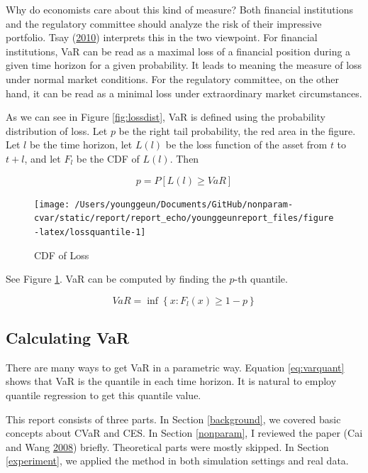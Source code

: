 \documentclass[
]{article}
\theoremstyle{definition}
\theoremstyle{definition}
\theoremstyle{definition}
\theoremstyle{remark}
\begin{document}
Why do economists care about this kind of measure? Both financial institutions and the regulatory committee should analyze the risk of their impressive portfolio. Tsay (\protect\hyperlink{ref-Tsay:2010aa}{2010}) interprets this in the two viewpoint. For financial institutions, VaR can be read as a maximal loss of a financial position during a given time horizon for a given probability. It leads to meaning the measure of loss under normal market conditions. For the regulatory committee, on the other hand, it can be read as a minimal loss under extraordinary market circumstances.

As we can see in Figure \ref{fig:lossdist}, VaR is defined using the probability distribution of loss. Let \(p\) be the right tail probability, the red area in the figure. Let \(l\) be the time horizon, let \(L(l)\) be the loss function of the asset from \(t\) to \(t + l\), and let \(F_l\) be the CDF of \(L(l)\). Then

\begin{equation}
  p = P \left[ L(l) \ge VaR \right]
  \label{eq:vardef}
\end{equation}

\begin{figure}[H]

{\centering \texttt{[image: /Users/younggeun/Documents/GitHub/nonparam-cvar/static/report/report\_echo/younggeunreport\_files/figure-latex/lossquantile-1]} 

}

\caption{CDF of Loss}\label{fig:lossquantile}
\end{figure}

See Figure \ref{fig:lossquantile}. VaR can be computed by finding the \(p\)-th quantile.

\begin{equation}
  VaR = \inf \left\{ x \mathpunct{:} F_l(x) \ge 1 - p \right\}
  \label{eq:varquant}
\end{equation}

\hypertarget{calculating-var}{%
\subsection{Calculating VaR}\label{calculating-var}}

There are many ways to get VaR in a parametric way. Equation \eqref{eq:varquant} shows that VaR is the quantile in each time horizon. It is natural to employ quantile regression to get this quantile value.

This report consists of three parts. In Section \ref{background}, we covered basic concepts about CVaR and CES. In Section \ref{nonparam}, I reviewed the paper (Cai and Wang \protect\hyperlink{ref-cai:2008aa}{2008}) briefly. Theoretical parts were mostly skipped. In Section \ref{experiment}, we applied the method in both simulation settings and real data.
\end{document}
